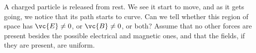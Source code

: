A charged particle is released from rest. We see it start to move,
        and as it gets going, we notice that its path starts to curve. Can
        we tell whether this region of space has $\vc{E}\neq 0$, or $\vc{B}\neq 0$, or both?
        Assume that no other forces are present besides the possible electrical and magnetic ones,
        and that the fields, if they are present, are uniform.
